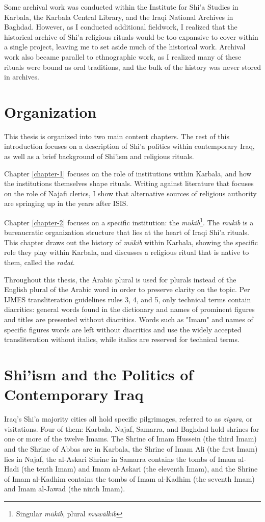 Some archival work was conducted within the Institute for Shi'a Studies in Karbala, the Karbala Central Library, and the Iraqi National Archives in Baghdad. However, as I conducted additional fieldwork, I realized that the historical archive of Shi'a religious rituals would be too expansive to cover within a single project, leaving me to set aside much of the historical work. Archival work also became parallel to ethnographic work, as I realized many of these rituals were bound as oral traditions, and the bulk of the history was never stored in archives. 

\section{Organization}

This thesis is organized into two main content chapters. The rest of this introduction focuses on a description of Shi'a politics within contemporary Iraq, as well as a brief background of Shi'ism and religious rituals.

Chapter \ref{chapter-1} focuses on the role of institutions within Karbala, and how the institutions themselves shape rituals. Writing against literature that focuses on the role of Najafi clerics, I show that alternative sources of religious authority are springing up in the years after ISIS.

Chapter \ref{chapter-2} focuses on a specific institution: the \emph{mūkib}\footnote{Singular \emph{mūkib}, plural \emph{muwālkib}}. The \emph{mūkib} is a bureaucratic organization structure that lies at the heart of Iraqi Shi'a rituals. This chapter draws out the history of \emph{mūkib} within Karbala, showing the specific role they play within Karbala, and discusses a religious ritual that is native to them, called the \emph{radat}.

Throughout this thesis, the Arabic plural is used for plurals instead of the English plural of the Arabic word in order to preserve clarity on the topic. Per IJMES transliteration guidelines rules 3, 4, and 5, only technical terms contain diacritics: general words found in the dictionary and names of prominent figures and titles are presented without diacritics. Words such as "Imam" and names of specific figures words are left without diacritics and use the widely accepted transliteration without italics, while italics are reserved for technical terms.

\section{Shi'ism and the Politics of Contemporary Iraq}
Iraq's Shi'a majority cities all hold specific pilgrimages, referred to as \emph{ziyara}, or visitations. Four of them: Karbala, Najaf, Samarra, and Baghdad hold shrines for one or more of the twelve Imams. The Shrine of Imam Hussein (the third Imam) and the Shrine of Abbas are in Karbala, the Shrine of Imam Ali (the first Imam) lies in Najaf, the al-Askari Shrine in Samarra contains the tombs of Imam al-Hadi (the tenth Imam) and Imam al-Askari (the eleventh Imam), and the Shrine of Imam al-Kadhim contains the tombs of Imam al-Kadhim (the seventh Imam) and Imam al-Jawad (the ninth Imam). 

